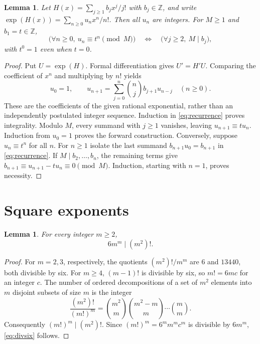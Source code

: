 \documentclass[11pt]{article}
\newtheorem{lemma}[theorem]{Lemma}
\DeclareMathOperator{\ex}{exp}
\begin{document}
\begin{lemma}\label{lem:transfer}
Let $H(x)=\sum_{j\geq1}b_jx^j/j!$ with $b_j\in\mathbb Z$, and write
$\ex(H(x))=\sum_{n\geq0}u_nx^n/n!$.
Then all $u_n$ are integers. For $M\geq1$ and $b_1=t\in\mathbb Z$,
\[
 \bigl(\forall n\geq0,\ u_n\equiv t^n\pmod M\bigr)
 \quad\Longleftrightarrow\quad
 \bigl(\forall j\geq2,\ M\mid b_j\bigr),
\]
with $t^0=1$ even when $t=0$.
\end{lemma}
\begin{proof}
Put $U=\ex(H)$. Formal differentiation gives $U'=H'U$.
Comparing the coefficient of $x^n$ and multiplying by $n!$ yields
\begin{equation}\label{eq:recurrence}
 u_0=1,\qquad
 u_{n+1}=\sum_{j=0}^n\binom{n}{j}b_{j+1}u_{n-j}
 \quad(n\geq0).
\end{equation}
These are the coefficients of the given rational exponential, rather than
an independently postulated integer sequence. Induction in
\eqref{eq:recurrence} proves integrality. Modulo $M$, every summand
with $j\geq1$ vanishes, leaving $u_{n+1}\equiv t u_n$.
Induction from $u_0=1$ proves the forward construction.
Conversely, suppose $u_n\equiv t^n$ for all $n$. For $n\geq1$ isolate
the last summand $b_{n+1}u_0=b_{n+1}$ in \eqref{eq:recurrence}.
If $M\mid b_2,\ldots,b_n$, the remaining terms give
$b_{n+1}\equiv u_{n+1}-t u_n\equiv0\pmod M$.
Induction, starting with $n=1$, proves necessity.
\end{proof}

\section{Square exponents}

\begin{lemma}\label{lem:six}
For every integer $m\geq2$,
\begin{equation}\label{eq:divsix}
 6m^m\mid(m^2)!.
\end{equation}
\end{lemma}
\begin{proof}
For $m=2,3$, respectively, the quotients $(m^2)!/m^m$ are $6$ and
$13440$, both divisible by six.
For $m\geq4$, $(m-1)!$ is divisible by six, so $m!=6m c$ for an integer $c$.
The number of ordered decompositions of a set of $m^2$ elements into
$m$ disjoint subsets of size $m$ is the integer
\[
 \frac{(m^2)!}{(m!)^m}
   =\binom{m^2}{m}\binom{m^2-m}{m}\cdots\binom{m}{m}.
\]
Consequently $(m!)^m\mid(m^2)!$.
Since $(m!)^m=6^m m^m c^m$ is divisible by $6m^m$, \eqref{eq:divsix} follows.
\end{proof}
\end{document}
